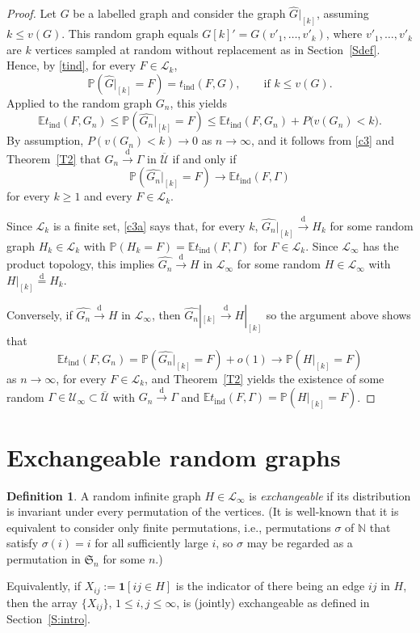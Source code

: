 \documentclass[11pt,reqno,tbtags]{amsart}
\numberwithin{equation}{section}
\theoremstyle{definition}
\newtheorem*{definition}{Definition}
\theoremstyle{remark}
\newcommand{\refT}[1]{Theorem~\ref{#1}}
\newcommand{\refS}[1]{Section~\ref{#1}}
\newcommand\set[1]{\ensuremath{\{#1\}}}
\newcommand\xpar[1]{(#1)}
\newcommand\bigpar[1]{\bigl(#1\bigr)}
\newcommand\lrpar[1]{\left(#1\right)}
\newcommand\ntoo{\ensuremath{{n\to\infty}}}
\newcommand\ie{i.e.\spacefactor=1000}
\newcommand{\tend}{\longrightarrow}
\newcommand\dto{\overset{\mathrm{d}}{\tend}}
\newcommand\eqd{\overset{\mathrm{d}}{=}}
\newcommand\bbN{\mathbb N}
\newcommand\E{\operatorname{\mathbb E{}}}
\renewcommand\P{\operatorname{\mathbb P{}}}
\newcommand\gG{\Gamma}
\newcommand\gs{\sigma}
\newcommand\cL{{\mathcal L}}
\newcommand\cU{{\mathcal U}}
\newcommand\ett[1]{\boldsymbol1[#1]}
\renewcommand{\=}{:=}
\newcommand{\xk}{[k]}
\newcommand{\vvki}{v'_1,\dots,v'_k}
\newcommand{\tind}{t_{\mathrm{ind}}}
\newcommand{\cuq}{\overline{\cU}}
\newcommand{\cuoo}{\cU_\infty}
\newcommand{\cloo}{\cL_\infty}
\newcommand\hG{\widehat G}
\newcommand\hgn{\widehat {G_n}}
\newcommand{\rest}[1]{|_{[#1]}}
\newcommand{\exch}{exchangeable}
\newcommand{\sn}{\mathfrak S_n}
\begin{document}
\begin{proof}
Let $G$ be a labelled graph and consider the graph $\hG\rest k$,
assuming $k\le v(G)$. This random graph equals $G\xk'=G(\vvki)$, where
$\vvki$ are $k$ vertices sampled at random without replacement as in
\refS{Sdef}. 
Hence, by \eqref{tind}, for every $F\in\cL_k$,
\begin{equation*}
  \P\xpar{\hG\rest k =F} = \tind(F,G),
\qquad \text{if } k\le v(G).
\end{equation*}
Applied to the random graph $G_n$, this yields
\begin{equation}
  \label{c3}
\E\tind(F,G_n)
\le
\P\xpar{\hgn\rest k =F} \le \E\tind(F,G_n) + P\bigpar{v(G_n)<k}.
\end{equation}
By assumption, $P\lrpar{v(G_n)<k}\to0$ as \ntoo, and it follows from
\eqref{c3} and \refT{T2} that $G_n\dto \gG$ in $\cuq$ if and only if
\begin{equation}\label{c3a}
  \P\xpar{\hgn\rest k =F} \to \E\tind(F,\gG)
\end{equation}
for every $k\ge1$ and every $F\in\cL_k$.

Since $\cL_k$ is a finite set, \eqref{c3a} says that, for every $k$,
$\hgn\rest k\dto H_k$ for some random graph $H_k\in\cL_k$ with
$\P(H_k=F)=\E\tind(F,\gG)$ for $F\in\cL_k$. Since $\cloo$ has the
product topology, this implies $\hgn\dto H$ in $\cloo$ for some random
$H\in\cloo$ with $H\rest k\eqd H_k$.

Conversely, if $\hgn\dto H$ in $\cloo$, then $\hgn\rest k\dto H\rest
k$ so the argument above shows that
\begin{equation*}
  \E\tind(F,G_n)=\P\xpar{\hgn\rest k=F}+o(1)\to\P\xpar{H\rest k=F}
\end{equation*}
as \ntoo, for every $F\in\cL_k$, and \refT{T2} yields the existence of
some random $\gG\in\cuoo\subset\cuq$ with $G_n\dto \gG$
and
$\E\tind(F,\gG)=\P\xpar{H\rest k=F}$. 
\end{proof}


\section{Exchangeable random graphs}\label{Sexch}


\begin{definition}
  A random infinite graph $H\in\cloo$ is \emph{\exch} if its
  distribution is invariant under every permutation of the vertices.
(It is well-known that it is equivalent to consider only finite 
  permutations, \ie, permutations $\gs$ of $\bbN$ that satisfy
  $\gs(i)=i$ for all sufficiently large $i$, so $\gs$ may be regarded
  as a permutation in $\sn$ for some $n$.)

Equivalently, if $X_{ij}\=\ett{ij\in H}$ is the indicator of there 
being an edge $ij$ in $H$, then the array \set{X_{ij}}, $1\le
i,j\le\infty$, is (jointly) \exch{} as defined in \refS{S:intro}.
\end{definition}
\end{document}
